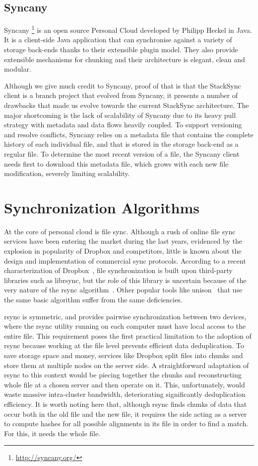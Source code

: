 \subsection{Syncany}
Syncany \footnote{\url{http://syncany.org/}} is an open source Personal Cloud developed by Philipp Heckel in Java. It is a client-side Java application that can synchronise against a variety of storage back-ends thanks to their extensible plugin model. They also provide extensible mechanisms for chunking and their architecture is elegant, clean and modular.

Although we give much credit to Syncany, proof of that is that the StackSync client is a branch project that evolved 
from Syncany, it presents a number of drawbacks that made us evolve towards the current StackSync architecture. 
The major shortcoming is the lack of scalability of Syncany due to its heavy pull strategy with metadata and
data flows heavily coupled. To support versioning and resolve conflicts, Syncany relies on a metadata file 
that contains the complete history of each individual file, and that is stored in the storage back-end
as a regular file. To determine the most recent version of a file, the Syncany client needs first to
download this metadata file, which grows with each new file modification, severely limiting scalability.

\section{Synchronization Algorithms}

At the core of personal cloud is file sync. Although a rush of online file sync services have
been entering the market during the last years, evidenced by the explosion in popularity of
Dropbox and competitors, little is known about the design and implementation of commercial
sync protocols. According to a recent characterization of Dropbox~\cite{drago2012inside}, file synchronization
is built upon third-party libraries such as librsync, but the role of this library is uncertain
because of the very nature of the rsync algorithm~\cite{tridgell96rsync}. Other popular tools like 
unison~\cite{unison} that use the same basic algorithm suffer from the same deficiencies.

rsync is symmetric, and provides pairwise synchronization between two devices, where the rsync
utility running on each computer must have local access to the entire file. This requirement
poses the first practical limitation to the adoption of rsync because working at the file level
prevents efficient data deduplication. To save storage space and money, services like Dropbox
split files into chunks and store them at multiple nodes on the server side. A straightforward
adaptation of rsync to this context would be piecing together the chunks and reconstructing
whole file at a chosen server and then operate on it. This, unfortunately, would waste massive
intra-cluster bandwidth, deteriorating significantly deduplication efficiency. It is worth
noting here that, although rsync finds chunks of data that occur both in the old file and the
new file, it requires the side acting as a server to compute hashes for all possible alignments
in its file in order to find a match. For this, it needs the whole file.  

